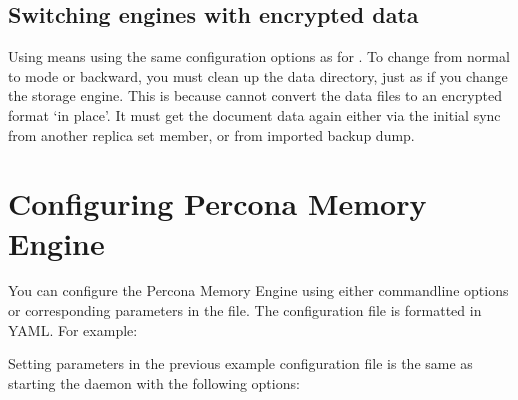 \documentclass[letterpaper,10pt,english]{sphinxmanual}
\begin{document}
\subsection{Switching engines with encrypted data}
\label{\detokenize{inmemory:switching-engines-with-encrypted-data}}
\sphinxAtStartPar
Using {\hyperref[\detokenize{data-at-rest-encryption:psmdb-data-at-rest-encryption}]{}} means using the same 
configuration options as for . To change from normal to {\hyperref[\detokenize{data-at-rest-encryption:psmdb-data-at-rest-encryption}]{}}
mode or backward, you must clean up the  data directory,
just as if you change the storage engine. This is because
 cannot convert the data files to an encrypted format ‘in place’. It
must get the document data again either via the initial sync from another
replica set member, or from imported backup dump.


\section{Configuring Percona Memory Engine}
\label{\detokenize{inmemory:configuring-percona-memory-engine}}
\sphinxAtStartPar
You can configure the Percona Memory Engine using either command\sphinxhyphen{}line options or
corresponding parameters in the  file.  The
configuration file is formatted in YAML. For example:

\begin{sphinxVerbatim}[commandchars=\\\{\}]
\end{sphinxVerbatim}

\sphinxAtStartPar
Setting parameters in the previous example configuration file is the same as
starting the  daemon with the following options:
\end{document}
